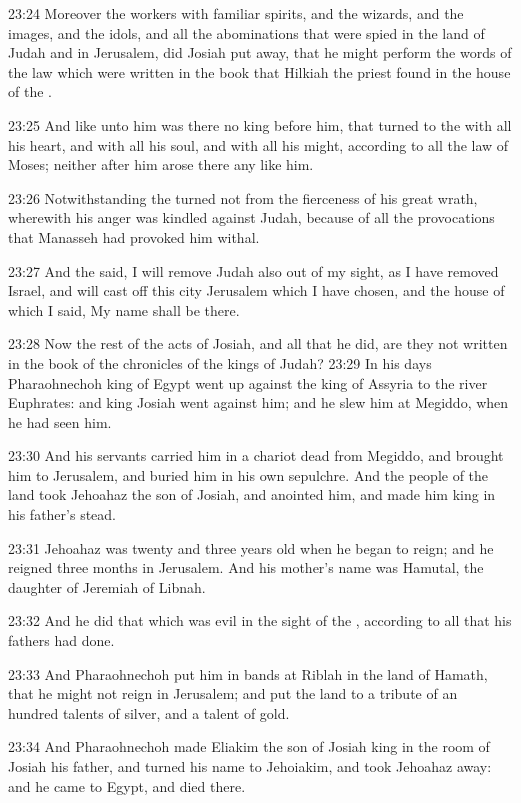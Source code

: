23:24 Moreover the workers with familiar spirits, and the wizards, and the images, and the idols, and all the abominations that were spied in the land of Judah and in Jerusalem, did Josiah put away, that he might perform the words of the law which were written in the book that Hilkiah the priest found in the house of the \LORD.

23:25 And like unto him was there no king before him, that turned to the \LORD with all his heart, and with all his soul, and with all his might, according to all the law of Moses; neither after him arose there any like him.

23:26 Notwithstanding the \LORD turned not from the fierceness of his great wrath, wherewith his anger was kindled against Judah, because of all the provocations that Manasseh had provoked him withal.

23:27 And the \LORD said, I will remove Judah also out of my sight, as I have removed Israel, and will cast off this city Jerusalem which I have chosen, and the house of which I said, My name shall be there.

23:28 Now the rest of the acts of Josiah, and all that he did, are they not written in the book of the chronicles of the kings of Judah?  23:29 In his days Pharaohnechoh king of Egypt went up against the king of Assyria to the river Euphrates: and king Josiah went against him; and he slew him at Megiddo, when he had seen him.

23:30 And his servants carried him in a chariot dead from Megiddo, and brought him to Jerusalem, and buried him in his own sepulchre. And the people of the land took Jehoahaz the son of Josiah, and anointed him, and made him king in his father's stead.

23:31 Jehoahaz was twenty and three years old when he began to reign; and he reigned three months in Jerusalem. And his mother's name was Hamutal, the daughter of Jeremiah of Libnah.

23:32 And he did that which was evil in the sight of the \LORD, according to all that his fathers had done.

23:33 And Pharaohnechoh put him in bands at Riblah in the land of Hamath, that he might not reign in Jerusalem; and put the land to a tribute of an hundred talents of silver, and a talent of gold.

23:34 And Pharaohnechoh made Eliakim the son of Josiah king in the room of Josiah his father, and turned his name to Jehoiakim, and took Jehoahaz away: and he came to Egypt, and died there.

